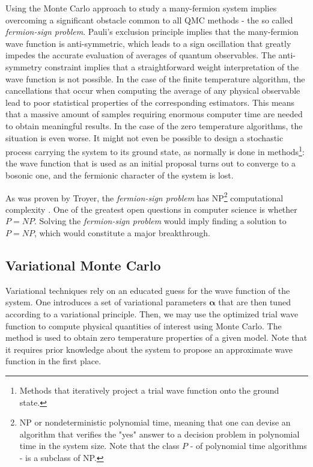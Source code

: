 Using the Monte Carlo approach to study a many-fermion system implies overcoming a significant obstacle common to all \ac{QMC} methods - the so called \emph{fermion-sign problem}.
Pauli's exclusion principle implies that the many-fermion wave function is anti-symmetric, which leads to a sign oscillation that greatly impedes the accurate evaluation of averages of quantum observables.
The anti-symmetry constraint implies that a  straightforward weight interpretation of the wave function is not possible.
In the case of the finite temperature algorithm, the cancellations that occur when computing the average of any physical observable lead to poor statistical properties of the corresponding estimators.
This means that a massive amount of samples requiring enormous computer time are needed to obtain meaningful results.
In the case of the zero temperature algorithms, the situation is even worse.
It might not even be possible to design a stochastic process carrying the system to its ground state, as normally is done in  methods\footnote{Methods that iteratively project a trial wave function onto the ground state.}: the wave function that is used as an initial proposal turns out to converge to a bosonic one, and the fermionic character of the system is lost.

As was proven by Troyer, the \emph{fermion-sign problem} has NP\footnote{NP or nondeterministic polynomial time, meaning that one can devise an algorithm that verifies the "yes" answer to a decision problem in polynomial time in the system size.
Note that the class $P$ - of polynomial time algorithms - is a subclass of NP.} computational complexity \cite{troyer_computational_2005}.
One of the greatest open questions in computer science is whether $P = NP$.
Solving the \emph{fermion-sign problem} would imply finding a solution to $P = NP$, which would constitute a major breakthrough.

\subsection{Variational Monte Carlo}

Variational techniques rely on an educated guess for the wave function of the system.
One introduces a set of variational parameters $\bm \alpha$ that are then tuned according to a variational principle.
Then, we may use the optimized trial wave function to compute physical quantities of interest using Monte Carlo.
The method is used to obtain zero temperature properties of a given model.
Note that it requires prior knowledge about the system to propose an approximate wave function in the first place.


